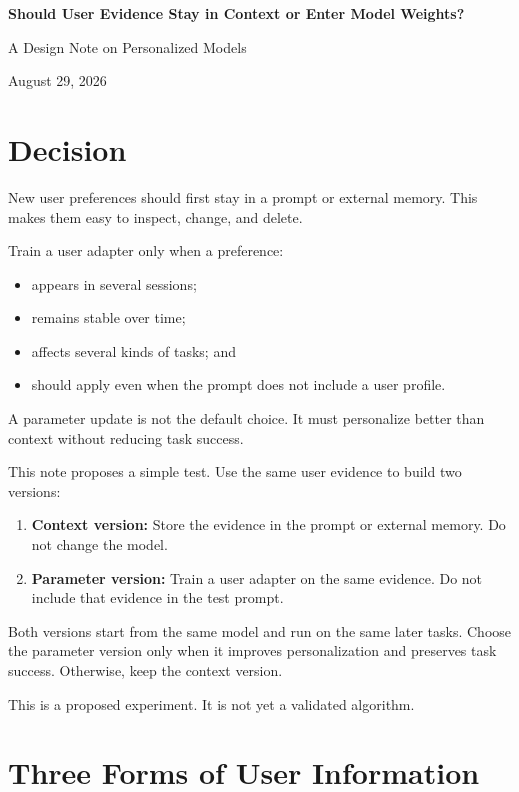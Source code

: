 \documentclass[11pt]{article}
\begin{document}
\begin{center}
  {\LARGE\bfseries Should User Evidence Stay in Context or Enter Model
  Weights?\par}
  \vspace{5pt}
  {\large A Design Note on Personalized Models\par}
  \vspace{4pt}
  {\small August 29, 2026}
\end{center}

\section{Decision}

New user preferences should first stay in a prompt or external memory. This
makes them easy to inspect, change, and delete.

Train a user adapter only when a preference:
\begin{itemize}
  \item appears in several sessions;
  \item remains stable over time;
  \item affects several kinds of tasks; and
  \item should apply even when the prompt does not include a user profile.
\end{itemize}

A parameter update is not the default choice. It must personalize better than
context without reducing task success.

This note proposes a simple test. Use the same user evidence to build two
versions:
\begin{enumerate}
  \item \textbf{Context version:} Store the evidence in the prompt or external
  memory. Do not change the model.
  \item \textbf{Parameter version:} Train a user adapter on the same evidence.
  Do not include that evidence in the test prompt.
\end{enumerate}
Both versions start from the same model and run on the same later tasks.
Choose the parameter version only when it improves personalization and
preserves task success. Otherwise, keep the context version.

This is a proposed experiment. It is not yet a validated algorithm.

\section{Three Forms of User Information}
\end{document}
